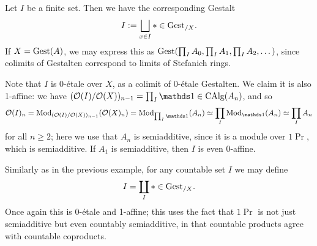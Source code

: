 \documentclass[11pt]{book}
\begin{document}
	\begin{example}
		Let $I$ be a finite set. Then we have the corresponding Gestalt
		\[
			I := \bigsqcup_{x \in I} * \in {\textup{Gest}}_{/X}.
		\]
		If $X = {\textup{Gest}}(A)$, we may express this as ${\textup{Gest}}(\prod_{I} A_0, \prod_I A_1, \prod_I A_2, \dots)$, since colimits of Gestalten correspond to limits of Stefanich rings.

		Note that $I$ is 0-étale over $X$, as a colimit of 0-étale Gestalten. We claim it is also 1-affine: we have $(\Oo(I)/\Oo(X))_{n-1} = \prod_I \unit \in \CAlg(A_n)$, and so
		\[
			\Oo(I)_n = \Mod_{(\Oo(I)/\Oo(X))_{n-1}}(\Oo(X)_n) = \Mod_{\prod_I \unit}(A_n) \simeq \prod_I \Mod_{\unit}(A_n) \simeq \prod_{I} A_n
		\]
		for all $n \geq 2$; here we use that $A_n$ is semiadditive, since it is a module over $1\Pr$, which is semiadditive. If $A_1$ is semiadditive, then $I$ is even 0-affine.
	\end{example}

	\begin{example}
		Similarly as in the previous example, for any countable set $I$ we may define
		\[
			I = \coprod_I * \in {\textup{Gest}}_{/X}.
		\]
		Once again this is $0$-étale and 1-affine; this uses the fact that $1\Pr$ is not just semiadditive but even countably semiadditive, in that countable products agree with countable coproducts.
	\end{example}
\end{document}
